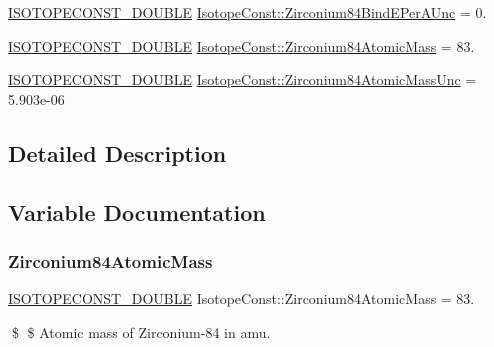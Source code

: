 \begin{DoxyCompactItemize}
\mbox{\hyperlink{group___isotope_const-_macros_ga8f45a7272ce02c0b4c65c44636ed719a}{I\+S\+O\+T\+O\+P\+E\+C\+O\+N\+S\+T\+\_\+\+D\+O\+U\+B\+LE}} \mbox{\hyperlink{group___isotope_const-_zirconium-_zr84_ga86c7943050eb785353472bf99df56575}{Isotope\+Const\+::\+Zirconium84\+Bind\+E\+Per\+A\+Unc}} = 0.
\item 
\mbox{\hyperlink{group___isotope_const-_macros_ga8f45a7272ce02c0b4c65c44636ed719a}{I\+S\+O\+T\+O\+P\+E\+C\+O\+N\+S\+T\+\_\+\+D\+O\+U\+B\+LE}} \mbox{\hyperlink{group___isotope_const-_zirconium-_zr84_ga7d0330d89106d901785f0b0ff583451f}{Isotope\+Const\+::\+Zirconium84\+Atomic\+Mass}} = 83.
\item 
\mbox{\hyperlink{group___isotope_const-_macros_ga8f45a7272ce02c0b4c65c44636ed719a}{I\+S\+O\+T\+O\+P\+E\+C\+O\+N\+S\+T\+\_\+\+D\+O\+U\+B\+LE}} \mbox{\hyperlink{group___isotope_const-_zirconium-_zr84_ga6c51730457b463fd816a9c79622ea33d}{Isotope\+Const\+::\+Zirconium84\+Atomic\+Mass\+Unc}} = 5.\+903e-\/06
\end{DoxyCompactItemize}


\subsection{Detailed Description}


\subsection{Variable Documentation}
\mbox{\label{group___isotope_const-_zirconium-_zr84_ga7d0330d89106d901785f0b0ff583451f}} 
\subsubsection{\texorpdfstring{Zirconium84\+Atomic\+Mass}{Zirconium84AtomicMass}}
{\footnotesize\ttfamily \mbox{\hyperlink{group___isotope_const-_macros_ga8f45a7272ce02c0b4c65c44636ed719a}{I\+S\+O\+T\+O\+P\+E\+C\+O\+N\+S\+T\+\_\+\+D\+O\+U\+B\+LE}} Isotope\+Const\+::\+Zirconium84\+Atomic\+Mass = 83.}

\$ \$ Atomic mass of Zirconium-\/84 in amu. \mbox{\label{group___isotope_const-_zirconium-_zr84_ga6c51730457b463fd816a9c79622ea33d}} 

